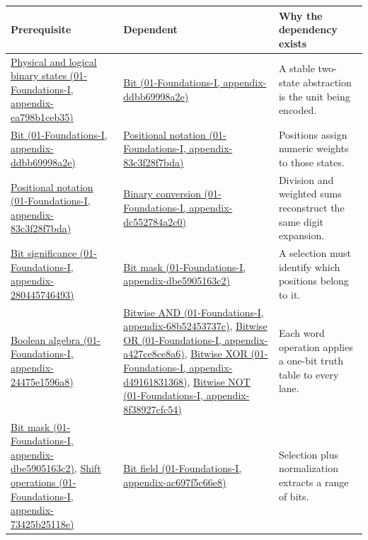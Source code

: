 {\def\LTcaptype{none} %
\begin{longtable}[]{@{}
  >{\raggedright\arraybackslash}p{}
  >{\raggedright\arraybackslash}p{}
  >{\raggedright\arraybackslash}p{}@{}}
\toprule\noalign{}
\begin{minipage}[b]{\linewidth}\raggedright
Prerequisite
\end{minipage} & \begin{minipage}[b]{\linewidth}\raggedright
Dependent
\end{minipage} & \begin{minipage}[b]{\linewidth}\raggedright
Why the dependency exists
\end{minipage} \\
\midrule\noalign{}
\endhead
\bottomrule\noalign{}
\endlastfoot
\href{}{Physical and logical binary states (01-Foundations-I, appendix-ea798b1ceb35)} & \href{}{Bit (01-Foundations-I, appendix-ddbb69998a2e)} & A stable two-state abstraction is the unit being encoded. \\
\href{}{Bit (01-Foundations-I, appendix-ddbb69998a2e)} & \href{}{Positional notation (01-Foundations-I, appendix-83c3f28f7bda)} & Positions assign numeric weights to those states. \\
\href{}{Positional notation (01-Foundations-I, appendix-83c3f28f7bda)} & \href{}{Binary conversion (01-Foundations-I, appendix-dc552784a2c0)} & Division and weighted sums reconstruct the same digit expansion. \\
\href{}{Bit significance (01-Foundations-I, appendix-280445746493)} & \href{}{Bit mask (01-Foundations-I, appendix-dbe5905163c2)} & A selection must identify which positions belong to it. \\
\href{}{Boolean algebra (01-Foundations-I, appendix-24475e1596a8)} & \href{}{Bitwise AND (01-Foundations-I, appendix-68b52453737c)}, \href{}{Bitwise OR (01-Foundations-I, appendix-a427ce8ce8a6)}, \href{}{Bitwise XOR (01-Foundations-I, appendix-d49161831368)}, \href{}{Bitwise NOT (01-Foundations-I, appendix-8f38927cfc54)} & Each word operation applies a one-bit truth table to every lane. \\
\href{}{Bit mask (01-Foundations-I, appendix-dbe5905163c2)}, \href{}{Shift operations (01-Foundations-I, appendix-73425b25118e)} & \href{}{Bit field (01-Foundations-I, appendix-ac697f5c66e8)} & Selection plus normalization extracts a range of bits. \\

\end{longtable}}
